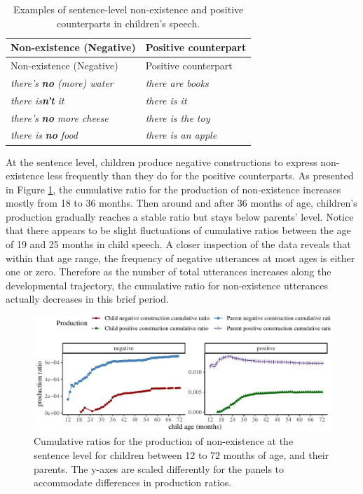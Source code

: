 \documentclass[
  english,
  man,floatsintext]{apa6}
\begin{document}
\begin{longtable}[]{@{}ll@{}}
\caption{\label{tab:nonexist} Examples of sentence-level non-existence and positive counterparts in children's speech.}\tabularnewline
\toprule
Non-existence (Negative) & Positive counterpart \\
\midrule
\endfirsthead
\toprule
Non-existence (Negative) & Positive counterpart \\
\midrule
\endhead
\emph{there's} \textbf{\emph{no}} \emph{(more) water} & \emph{there are books} \\
\emph{there is}\textbf{\emph{n't}} \emph{it} & \emph{there is it} \\
\emph{there's} \textbf{\emph{no}} \emph{more cheese} & \emph{there is the toy} \\
\emph{there is} \textbf{\emph{no}} \emph{food} & \emph{there is an apple} \\
\bottomrule
\end{longtable}

At the sentence level, children produce negative constructions to express non-existence less frequently than they do for the positive counterparts. As presented in Figure \ref{fig:existence}, the cumulative ratio for the production of non-existence increases mostly from 18 to 36 months. Then around and after 36 months of age, children's production gradually reaches a stable ratio but stays below parents' level. Notice that there appears to be slight fluctuations of cumulative ratios between the age of 19 and 25 months in child speech. A closer inspection of the data reveals that within that age range, the frequency of negative utterances at most ages is either one or zero. Therefore as the number of total utterances increases along the developmental trajectory, the cumulative ratio for non-existence utterances actually decreases in this brief period.

\begin{figure}[H]

{\centering \includegraphics{neg_construction_article_files/figure-latex/existence-1} 

}

\caption{Cumulative ratios for the production of non-existence at the sentence level for children between 12 to 72 months of age, and their parents. The y-axes are scaled differently for the panels to accommodate differences in production ratios.}\label{fig:existence}
\end{figure}
\end{document}
